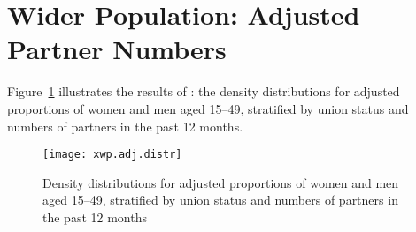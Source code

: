 \section{Wider Population: Adjusted Partner Numbers}\label{app.model.wp}
Figure~\ref{fig:xwp.adj.dens} illustrates the results of :
the density distributions for adjusted proportions of women and men aged 15--49,
stratified by union status and numbers of partners in the past 12 months.
\begin{figure}[h]
  \centering
  \texttt{[image: xwp.adj.distr]}
  \caption{Density distributions for adjusted proportions of women and men aged 15--49,
    stratified by union status and numbers of partners in the past 12 months}
  \label{fig:xwp.adj.dens}
\end{figure}
\clearpage %
